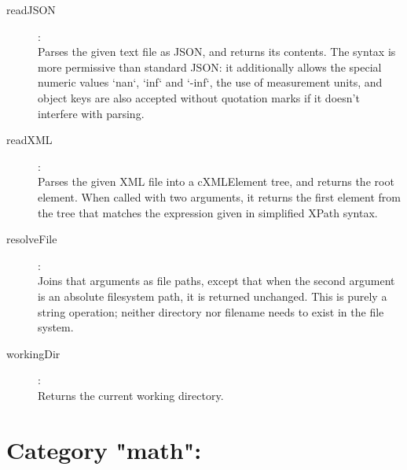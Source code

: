 \begin{description}
\item[readJSON]:  \\
    Parses the given text file as JSON, and returns its contents. The syntax is
    more permissive than standard JSON: it additionally allows the special
    numeric values `nan`, `inf` and `-inf`, the use of measurement units, and
    object keys are also accepted without quotation marks if it doesn't
    interfere with parsing.

\item[readXML]:  \\
    Parses the given XML file into a cXMLElement tree, and returns the root
    element. When called with two arguments, it returns the first element from
    the tree that matches the expression given in simplified XPath syntax.

\item[resolveFile]:  \\
    Joins that arguments as file paths, except that when the second argument is
    an absolute filesystem path, it is returned unchanged. This is purely a
    string operation; neither directory nor filename needs to exist in the file
    system.

\item[workingDir]:  \\
    Returns the current working directory.


\end{description}

\section{Category "math":}
\label{sec:ned-functions:category-math}

